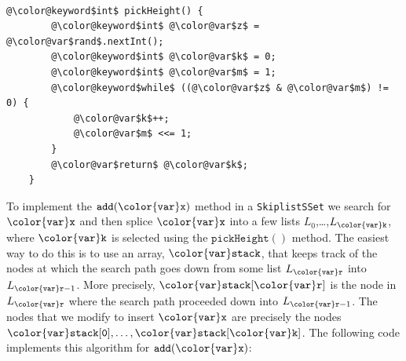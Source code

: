 \documentclass[10pt]{book}
\theoremstyle{plain}
\theoremstyle{definition}
\begin{document}
 \ \vspace{.5ex}\begin{Verbatim}[gobble=1,tabsize=2,frame=single,framerule=1.2pt,commandchars=\\@\$,label=\texttt{SkiplistSSet},labelposition=topline]
	@\color@keyword$int$ pickHeight() {
		@\color@keyword$int$ @\color@var$z$ = @\color@var$rand$.nextInt();
		@\color@keyword$int$ @\color@var$k$ = 0;
		@\color@keyword$int$ @\color@var$m$ = 1;
		@\color@keyword$while$ ((@\color@var$z$ & @\color@var$m$) != 0) {
			@\color@var$k$++;
			@\color@var$m$ <<= 1;
		}
		@\color@var$return$ @\color@var$k$;
	}
\end{Verbatim}


To implement the \ensuremath{\mathtt{add({\color{var}x})}} method in a \texttt{SkiplistSSet} we search for \ensuremath{\mathtt{{\color{var}x}}}
and then splice \ensuremath{\mathtt{{\color{var}x}}} into a few lists $L_0$,\ldots,$L_{\ensuremath{\mathtt{{\color{var}k}}}}$, where \ensuremath{\mathtt{{\color{var}k}}}
is selected using the \ensuremath{\mathtt{pickHeight()}} method. The easiest way to do this
is to use an array, \ensuremath{\mathtt{{\color{var}stack}}}, that keeps track of the nodes at which
the search path goes down from some list $L_{\ensuremath{\mathtt{{\color{var}r}}}}$ into $L_{\ensuremath{\mathtt{{\color{var}r}}}-1}$.
More precisely, \ensuremath{\mathtt{{\color{var}stack}[{\color{var}r}]}} is the node in $L_{\ensuremath{\mathtt{{\color{var}r}}}}$ where the search path
proceeded down into $L_{\ensuremath{\mathtt{{\color{var}r}}}-1}$.  The nodes that we modify to insert \ensuremath{\mathtt{{\color{var}x}}}
are precisely the nodes $\ensuremath{\mathtt{{\color{var}stack}[0]}},\ldots,\ensuremath{\mathtt{{\color{var}stack}[{\color{var}k}]}}$.  The following
code implements this algorithm for \ensuremath{\mathtt{add({\color{var}x})}}:
\label{pg:skiplist-add}
\end{document}
